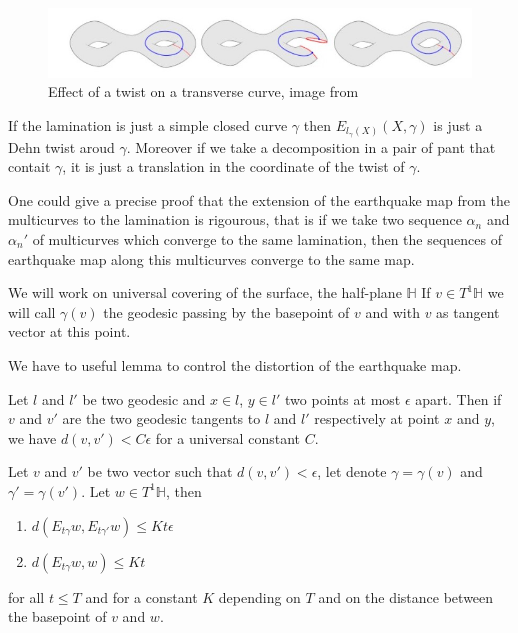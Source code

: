 \begin{figure}[h!]
\centering
\includegraphics[width=12cm]{Image/Earthquake.jpg}
\caption{Effect of a twist on a transverse curve, image from \cite{wright2020tour}}
\end{figure}

\begin{rmq}
If the lamination is just a simple closed curve $\gamma$ then $E_{l_{\gamma}(X)}(X,\gamma)$ is just a Dehn twist aroud $\gamma$.
Moreover if we take a decomposition in a pair of pant that contait $\gamma$, it is just a translation in the coordinate of the twist of $\gamma$.
\end{rmq}

One could give a precise proof that the extension of the earthquake map from the multicurves to the lamination is rigourous, that is if we take two sequence $\alpha_n$ and $\alpha_n'$ of multicurves which converge to the same lamination, then the sequences of earthquake map along this multicurves converge to the same map.

We will work on universal covering of the surface, the half-plane $\mathbb{H}$
If $v \in T^1 \mathbb{H}$ we will call $\gamma(v)$ the geodesic passing by the basepoint of $v$ and with $v$ as tangent vector at this point.

We have to useful lemma to control the distortion of the earthquake map.

\begin{lem}\label{DisVec}
Let $l$ and $l'$ be two geodesic and $x \in l$, $y \in l'$ two points at most $\epsilon$ apart. Then if $v$ and $v'$ are the two geodesic tangents to $l$ and $l'$ respectively at point $x$ and $y$,
we have $d(v,v')<C \epsilon$ for a universal constant $C$.
\end{lem}

\begin{lem}\label{DisShe}
Let $v$ and $v'$ be two vector such that $d(v,v') < \epsilon$, let denote $\gamma=\gamma(v)$ and $\gamma'=\gamma(v')$. Let $w\in T^1 \mathbb{H}$, then \begin{enumerate}
\item $d(E_{t \gamma}w,E_{t \gamma'}w) \leq Kt \epsilon$
\item $d(E_{t \gamma}w,w) \leq Kt $
\end{enumerate}
for all $t\leq T$ and for a constant $K$ depending on $T$ and on the distance between the basepoint of $v$ and $w$.
\end{lem}

